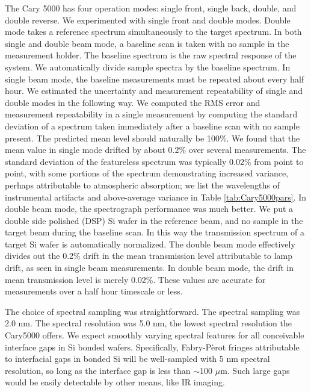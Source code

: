 \documentclass[osajnl,preprint,showpacs,superscriptaddress,12pt]{revtex4-1} %
\begin{document}
The Cary 5000 has four operation modes: single front, single back, double, and double reverse.  We experimented with single front and double modes.  Double mode takes a reference spectrum simultaneously to the target spectrum.  In both single and double beam mode, a baseline scan is taken with no sample in the measurement holder.  The baseline spectrum is the raw spectral response of the system.  We automatically divide sample spectra by the baseline spectrum.  In single beam mode, the baseline measurements must be repeated about every half hour.  We estimated the uncertainty and measurement repeatability of single and double modes in the following way.  We computed the RMS error and measurement repeatability in a single measurement by computing the standard deviation of a spectrum taken immediately after a baseline scan with no sample present.  The predicted mean level should naturally be 100\%.  We found that the mean value in single mode drifted by about 0.2\% over several measurements.  The standard deviation of the featureless spectrum was typically 0.02\% from point to point, with some portions of the spectrum demonstrating increased variance, perhaps attributable to atmospheric absorption; we list the wavelengths of instrumental artifacts and above-average variance in Table \ref{tab:Cary5000pars}. In double beam mode, the spectrograph performance was much better.  We put a double side polished (DSP) Si wafer in the reference beam, and no sample in the target beam during the baseline scan.  In this way the transmission spectrum of a target Si wafer is automatically normalized.  The double beam mode effectively divides out the 0.2\% drift in the mean transmission level attributable to lamp drift, as seen in single beam measurements.  In double beam mode, the drift in mean transmission level is merely 0.02\%.  These values are accurate for measurements over a half hour timescale or less.

The choice of spectral sampling was straightforward.  The spectral sampling was 2.0 nm.  The spectral resolution was 5.0 nm, the lowest spectral resolution the Cary5000 offers.  We expect smoothly varying spectral features for all conceivable interface gaps in Si bonded wafers.  Specifically, Fabry-P\`erot fringes attributable to interfacial gaps in bonded Si will be well-sampled with 5 nm spectral resolution, so long as the interface gap is less than $\sim$100 $\mu$m.  Such large gaps would be easily detectable by other means, like IR imaging.
\end{document}
